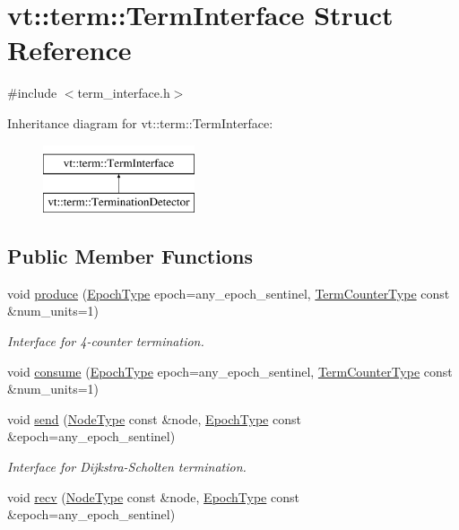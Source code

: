\hypertarget{structvt_1_1term_1_1_term_interface}{}\section{vt\+:\+:term\+:\+:Term\+Interface Struct Reference}
\label{structvt_1_1term_1_1_term_interface}


{\ttfamily \#include $<$term\+\_\+interface.\+h$>$}

Inheritance diagram for vt\+:\+:term\+:\+:Term\+Interface\+:\begin{figure}[H]
\begin{center}
\leavevmode
\includegraphics[height=2.000000cm]{structvt_1_1term_1_1_term_interface}
\end{center}
\end{figure}
\subsection*{Public Member Functions}
\begin{DoxyCompactItemize}
\item 
void \hyperlink{structvt_1_1term_1_1_term_interface_a38661883a7d3a721e50c6ab2d9e10edb}{produce} (\hyperlink{namespacevt_a985a5adf291c34a3ca263b3378388236}{Epoch\+Type} epoch=any\+\_\+epoch\+\_\+sentinel, \hyperlink{namespacevt_1_1term_a4fd378cdb0c36683afc1b3399d685f7f}{Term\+Counter\+Type} const \&num\+\_\+units=1)
\begin{DoxyCompactList}\small\item\em Interface for 4-\/counter termination. \end{DoxyCompactList}\item 
void \hyperlink{structvt_1_1term_1_1_term_interface_a6e117a0857540c82133b7a10bfa5d39e}{consume} (\hyperlink{namespacevt_a985a5adf291c34a3ca263b3378388236}{Epoch\+Type} epoch=any\+\_\+epoch\+\_\+sentinel, \hyperlink{namespacevt_1_1term_a4fd378cdb0c36683afc1b3399d685f7f}{Term\+Counter\+Type} const \&num\+\_\+units=1)
\item 
void \hyperlink{structvt_1_1term_1_1_term_interface_a21ef75badf08fea19807204e502ec4fe}{send} (\hyperlink{namespacevt_a866da9d0efc19c0a1ce79e9e492f47e2}{Node\+Type} const \&node, \hyperlink{namespacevt_a985a5adf291c34a3ca263b3378388236}{Epoch\+Type} const \&epoch=any\+\_\+epoch\+\_\+sentinel)
\begin{DoxyCompactList}\small\item\em Interface for Dijkstra-\/\+Scholten termination. \end{DoxyCompactList}\item 
void \hyperlink{structvt_1_1term_1_1_term_interface_afffcd1367305830597216a7b48886cb1}{recv} (\hyperlink{namespacevt_a866da9d0efc19c0a1ce79e9e492f47e2}{Node\+Type} const \&node, \hyperlink{namespacevt_a985a5adf291c34a3ca263b3378388236}{Epoch\+Type} const \&epoch=any\+\_\+epoch\+\_\+sentinel)
\end{DoxyCompactItemize}


